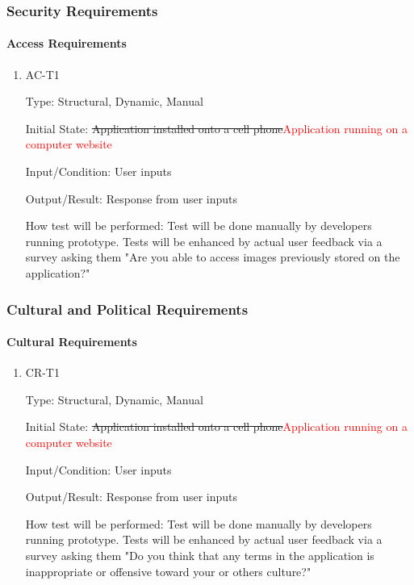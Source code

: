 \documentclass[12pt, titlepage]{article}
\begin{document}
\subsubsection{Security Requirements}
		
\paragraph{Access Requirements}

\begin{enumerate}

\item{AC-T1\\}

Type: Structural, Dynamic, Manual
					
Initial State: \sout{Application installed onto a cell phone}\textcolor{red}{Application running on a computer website}
					
Input/Condition: User inputs
					
Output/Result: Response from user inputs
					
How test will be performed: Test will be done manually by developers running prototype. Tests will be enhanced by actual user feedback via a survey asking them "Are you able to access images previously stored on the application?"

\end{enumerate}

\subsubsection{Cultural and Political Requirements}
		
\paragraph{Cultural Requirements}

\begin{enumerate}

\item{CR-T1\\}

Type: Structural, Dynamic, Manual
					
Initial State: \sout{Application installed onto a cell phone}\textcolor{red}{Application running on a computer website}
					
Input/Condition: User inputs
					
Output/Result: Response from user inputs
					
How test will be performed: Test will be done manually by developers running prototype. Tests will be enhanced by actual user feedback via a survey asking them "Do you think that any terms in the application is inappropriate or offensive toward your or others culture?"

\end{enumerate}
\end{document}

